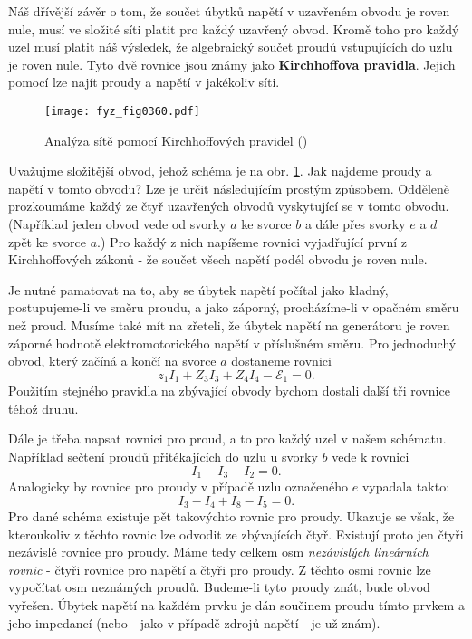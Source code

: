   Náš dřívější závěr o tom, že součet úbytků napětí v uzavřeném obvodu je roven nule, musí ve 
  složité síti platit pro každý uzavřený obvod. Kromě toho pro každý uzel musí platit náš výsledek, 
  že algebraický součet proudů vstupujících do uzlu je roven nule. Tyto dvě rovnice jsou známy jako 
  \textbf{Kirchhoffova pravidla}. Jejich pomocí lze najít proudy a napětí v jakékoliv síti.
  
  \begin{figure}[ht!] %
    \centering
    \texttt{[image: fyz\_fig0360.pdf]}
    \caption{Analýza sítě pomocí Kirchhoffových pravidel
             (\cite[s.~401]{Feynman02})}
    \label{fyz:fig0360}
  \end{figure}
  
  Uvažujme složitější obvod, jehož schéma je na obr. \ref{fyz:fig0360}. Jak najdeme proudy a napětí 
  v tomto obvodu? Lze je určit následujícím prostým způsobem. Odděleně prozkoumáme každý ze čtyř 
  uzavřených obvodů vyskytující se v tomto obvodu. (Například jeden obvod vede od svorky \(a\) ke 
  svorce \(b\) a dále přes svorky \(e\) a \(d\) zpět ke svorce \(a\).) Pro každý z nich napíšeme 
  rovnici vyjadřující první z Kirchhoffových zákonů - že součet všech napětí podél obvodu je roven 
  nule.
  
  Je nutné pamatovat na to, aby se úbytek napětí počítal jako kladný, postupujeme-li ve směru 
  proudu, a jako záporný, procházíme-li v opačném směru než proud. Musíme také mít na zřeteli, že 
  úbytek napětí na generátoru je roven záporné hodnotě elektromotorického napětí v příslušném 
  směru. Pro jednoduchý obvod, který začíná a končí na svorce \(a\) dostaneme rovnici
  \begin{equation*}
    z_1I_1 + Z_3I_3 + Z_4I_4 -\mathscr{E}_1 = 0.
  \end{equation*}
  Použitím stejného pravidla na zbývající obvody bychom dostali další tři rovnice téhož druhu. 
  
  Dále je třeba napsat rovnici pro proud, a to pro každý uzel v našem schématu. Například sečtení 
  proudů přitékajících do uzlu u svorky \(b\) vede k rovnici
  \begin{equation*}
    I_1 - I_3 - I_2 = 0.
  \end{equation*}
  Analogicky by rovnice pro proudy v případě uzlu označeného \(e\) vypadala takto:
  \begin{equation*}
    I_3 - I_4 + I_8 - I_5 = 0.
  \end{equation*}
  Pro dané schéma existuje pět takovýchto rovnic pro proudy. Ukazuje se však, že kteroukoliv z 
  těchto rovnic lze odvodit ze zbývajících čtyř. Existují proto jen čtyři nezávislé rovnice pro 
  proudy. Máme tedy celkem osm \emph{nezávislých lineárních rovnic} - čtyři rovnice pro napětí 
  a čtyři pro proudy. Z těchto osmi rovnic lze vypočítat osm neznámých proudů. Budeme-li tyto 
  proudy znát, bude obvod vyřešen. Úbytek napětí na každém prvku je dán součinem proudu tímto 
  prvkem a jeho impedancí (nebo - jako v případě zdrojů napětí - je už znám). 
  
